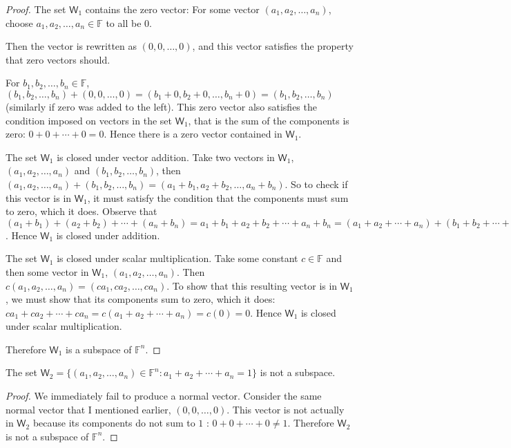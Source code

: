 \documentclass[11pt]{article}
\newcommand{\br}[1]{\left(#1\right)}
\newcommand{\cbr}[1]{\{#1\}}
\begin{document}
\begin{proof}
    The set $\mathsf{W}_1$ contains the zero vector: For some vector $\br{a_1,a_2,\dots, a_n}$, choose $a_1,a_2,\dots, a_n\in\mathbb{F}$ to all be $0$.
    
    Then the vector is rewritten as $\br{0,0,\dots, 0}$, and this vector satisfies the property that zero vectors should.
    
    For $b_1,b_2,\dots, b_n\in\mathbb{F}$, $\br{b_1,b_2,\dots, b_n} + \br{0,0,\dots, 0} = \br{b_1 + 0,b_2+0,\dots, b_n+0} = \br{b_1,b_2,\dots, b_n}$ (similarly if zero was added to the left). This zero vector also satisfies the condition imposed on vectors in the set $\mathsf{W}_1$, that is the sum of the components is zero: $0+0+\cdots+0 = 0$. Hence there is a zero vector contained in $\mathsf{W}_1$.

    The set $\mathsf{W}_1$ is closed under vector addition. Take two vectors in $\mathsf{W}_1$, $\br{a_1,a_2,\dots, a_n}$ and $\br{b_1,b_2,\dots, b_n}$, then $\br{a_1,a_2,\dots, a_n} + \br{b_1,b_2,\dots, b_n} = \br{a_1+b_1,a_2+b_2,\dots,a_n+b_n}$. So to check if this vector is in $\mathsf{W}_1$, it must satisfy the condition that the components must sum to zero, which it does. Observe that $\br{a_1+b_1} + \br{a_2+b_2} + \cdots +\br{a_n+b_n} = a_1+b_1+a_2+b_2+\cdots+a_n+b_n = \br{a_1+a_2+\cdots + a_n} + \br{b_1+b_2+\cdots + b_n} = 0+0 = 0$. Hence $\mathsf{W}_1$ is closed under addition.

    The set $\mathsf{W}_1$ is closed under scalar multiplication. Take some constant $c\in\mathbb{F}$ and then some vector in $\mathsf{W}_1$, $\br{a_1,a_2,\dots, a_n}$. Then $c\br{a_1,a_2,\dots, a_n} = \br{ca_1,ca_2,\dots, ca_n}$. To show that this resulting vector is in $\mathsf{W}_1$, we must show that its components sum to zero, which it does: $ca_1+ca_2+\cdots+ca_n = c\br{a_1+a_2+\cdots + a_n} = c\br{0} = 0$. Hence $\mathsf{W}_1$ is closed under scalar multiplication.

    Therefore $\mathsf{W}_1$ is a subspace of $\mathbb{F}^n$.
\end{proof}

The set $\mathsf{W}_2 = \cbr{\br{a_1,a_2,\dots, a_n}\in\mathbb{F}^n : a_1+a_2+\cdots + a_n = 1}$ is not a subspace.

\begin{proof}
    We immediately fail to produce a normal vector. Consider the same normal vector that I mentioned earlier, $\br{0,0,\dots, 0}$. This vector is not actually in $\mathsf{W}_2$ because its components do not sum to $1$ : $0+0+\cdots+0 \neq 1$. Therefore $\mathsf{W}_2$ is not a subspace of $\mathbb{F}^n$.
\end{proof}
\end{document}
